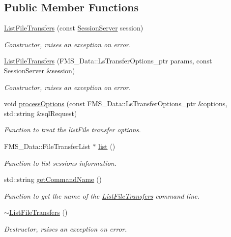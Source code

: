 \subsection*{Public Member Functions}
\begin{DoxyCompactItemize}
\item 
\hyperlink{classListFileTransfers_a9bfaf4ab3b09a09b82478f951a41cde3}{ListFileTransfers} (const \hyperlink{classSessionServer}{SessionServer} session)
\begin{DoxyCompactList}\small\item\em Constructor, raises an exception on error. \item\end{DoxyCompactList}\item 
\hyperlink{classListFileTransfers_acc6bd5f4a76a7f11182cb45cac687443}{ListFileTransfers} (FMS\_\-Data::LsTransferOptions\_\-ptr params, const \hyperlink{classSessionServer}{SessionServer} \&session)
\begin{DoxyCompactList}\small\item\em Constructor, raises an exception on error. \item\end{DoxyCompactList}\item 
void \hyperlink{classListFileTransfers_a72f8ab930001bbe48fa5f7f9e4abd00d}{processOptions} (const FMS\_\-Data::LsTransferOptions\_\-ptr \&options, std::string \&sqlRequest)
\begin{DoxyCompactList}\small\item\em Function to treat the listFile transfer options. \item\end{DoxyCompactList}\item 
FMS\_\-Data::FileTransferList $\ast$ \hyperlink{classListFileTransfers_a51a0f5e3382378220277271122a619d7}{list} ()
\begin{DoxyCompactList}\small\item\em Function to list sessions information. \item\end{DoxyCompactList}\item 
std::string \hyperlink{classListFileTransfers_a6d7e7aba9de33a523a30e80e43664f43}{getCommandName} ()
\begin{DoxyCompactList}\small\item\em Function to get the name of the \hyperlink{classListFileTransfers}{ListFileTransfers} command line. \item\end{DoxyCompactList}\item 
\hypertarget{classListFileTransfers_a8935d163d5de474062b01607a9d1a639}{
\hyperlink{classListFileTransfers_a8935d163d5de474062b01607a9d1a639}{$\sim$ListFileTransfers} ()}
\label{classListFileTransfers_a8935d163d5de474062b01607a9d1a639}

\begin{DoxyCompactList}\small\item\em Destructor, raises an exception on error. \item\end{DoxyCompactList}\end{DoxyCompactItemize}
